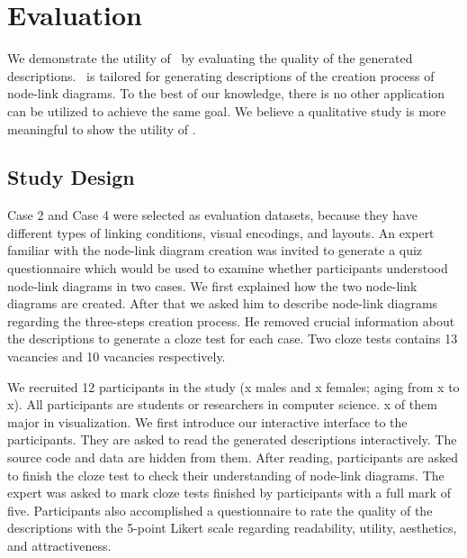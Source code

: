\section{Evaluation}
We demonstrate the utility of \ApproachName~by evaluating the quality of the generated descriptions.
\ApproachName~is tailored for generating descriptions of the creation process of node-link diagrams.
To the best of our knowledge, there is no other application can be utilized to achieve the same goal.
We believe a qualitative study is more meaningful to show the utility of \ApproachName.

\subsection{Study Design}
Case 2 and Case 4 were selected as evaluation datasets,
because they have different types of linking conditions, visual encodings, and layouts.
An expert familiar with the node-link diagram creation was invited to generate a quiz questionnaire which would be used to examine whether participants understood node-link diagrams in two cases.
We first explained how the two node-link diagrams are created.
After that we asked him to describe node-link diagrams regarding the three-steps creation process.
He removed crucial information about the descriptions to generate a cloze test for each case.
Two cloze tests contains 13 vacancies and 10 vacancies respectively.

We recruited 12 participants in the study ({\color{red}x} males and {\color{red}x} females; aging from {\color{red}x} to {\color{red}x}).
All participants are students or researchers in computer science.
{\color{red}x} of them major in visualization.
We first introduce our interactive interface to the participants.
They are asked to read the generated descriptions interactively.
The source code and data are hidden from them.
After reading, participants are asked to finish the cloze test to check their understanding of node-link diagrams.
The expert was asked to mark cloze tests finished by participants with a full mark of five.
Participants also accomplished a questionnaire to rate the quality of the descriptions with the 5-point Likert scale regarding readability, utility, aesthetics, and attractiveness.


